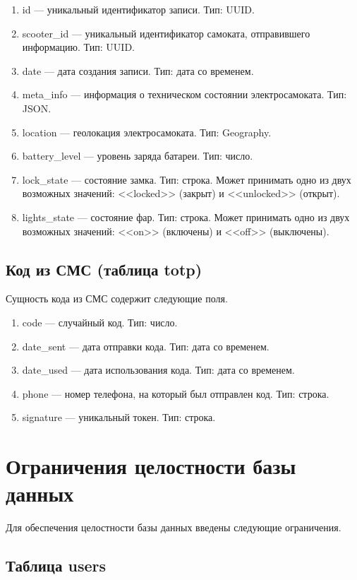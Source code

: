 \begin{enumerate}
    \item id --- уникальный идентификатор записи. Тип: UUID. 
    \item scooter\_id --- уникальный идентификатор самоката, отправившего информацию. Тип: UUID. 
    \item date --- дата создания записи. Тип: дата со временем. 
    \item meta\_info --- информация о техническом состоянии электросамоката. Тип: JSON. 
    \item location --- геолокация электросамоката. Тип: Geography. 
    \item battery\_level --- уровень заряда батареи. Тип: число. 
    \item lock\_state --- состояние замка. Тип: строка. Может принимать одно из двух возможных значений: <<locked>> (закрыт) и <<unlocked>> (открыт). 
    \item lights\_state --- состояние фар. Тип: строка. Может принимать одно из двух возможных значений: <<on>> (включены) и <<off>> (выключены). 
\end{enumerate}

\subsection{Код из СМС (таблица totp)}

Сущность кода из СМС содержит следующие поля.

\begin{enumerate}
    \item code --- случайный код. Тип: число. 
    \item date\_sent --- дата отправки кода. Тип: дата со временем. 
    \item date\_used --- дата использования кода. Тип: дата со временем.
    \item phone --- номер телефона, на который был отправлен код. Тип: строка. 
    \item signature --- уникальный токен. Тип: строка. 
\end{enumerate}

\section{Ограничения целостности базы данных}

Для обеспечения целостности базы данных введены следующие ограничения.

\subsection{Таблица users}

